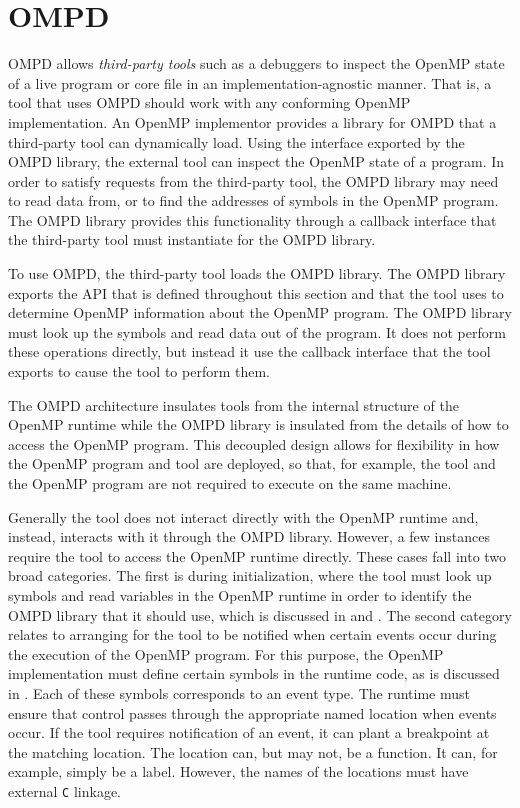 \section{OMPD}
\label{sec:ompd-overview}
\label{sec:third-party-tool-callback-interface}

OMPD allows \emph{third-party tools} such as a debuggers to inspect the 
OpenMP state of a live program or core file in an implementation-agnostic 
manner. That is, a tool that uses OMPD should work with any conforming 
OpenMP implementation. An OpenMP implementor provides a library for OMPD 
that a third-party tool can dynamically load. Using the interface exported 
by the OMPD library, the external tool can inspect the OpenMP state of a 
program. In order to satisfy requests from the third-party tool, the OMPD 
library may need to read data from, or to find the addresses of symbols in 
the OpenMP program. The OMPD library provides this functionality through a 
callback interface that the third-party tool must instantiate for the OMPD library.

To use OMPD, the third-party tool loads the OMPD library. The OMPD library exports 
the API that is defined throughout this section and that the tool uses to 
determine OpenMP information about the OpenMP program. The OMPD library must
look up the symbols and read data out of the program. It does not perform
these operations directly, but instead it use the callback interface that the
tool exports to cause the tool to perform them.

The OMPD architecture insulates tools from the internal structure of the 
OpenMP runtime while the OMPD library is insulated from the details of how 
to access the OpenMP program. This decoupled design allows for flexibility in how 
the OpenMP program and tool are deployed, so that, for example, the tool and the 
OpenMP program are not required to execute on the same machine.

Generally the tool does not interact directly with the OpenMP runtime and, 
instead, interacts with it through the OMPD library. However, a few instances 
require the tool to access the OpenMP runtime directly. These cases fall into 
two broad categories. The first is during initialization, where the tool must
look up symbols and read variables in the OpenMP runtime in order to identify 
the OMPD library that it should use, which is discussed in 
 and 
. The second category relates to 
arranging for the tool to be notified when certain events occur during the 
execution of the OpenMP program. For this purpose, the OpenMP implementation
must define certain symbols in the runtime code, as is discussed in 
. Each of these symbols corresponds 
to an event type. The runtime must ensure that control passes through the 
appropriate named location when events occur. If the tool requires notification 
of an event, it can plant a breakpoint at the matching location. The location 
can, but may not, be a function. It can, for example, simply be a label. However, 
the names of the locations must have external \texttt{C} linkage.

